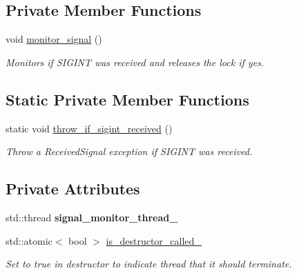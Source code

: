 \subsection*{Private Member Functions}
\begin{DoxyCompactItemize}
\item 
void \hyperlink{classtime__series_1_1internal_1_1TimeSeriesBase_adac95950208bcb190556db4b8b42cbf0}{monitor\+\_\+signal} ()
\begin{DoxyCompactList}\small\item\em Monitors if S\+I\+G\+I\+NT was received and releases the lock if yes. \end{DoxyCompactList}\end{DoxyCompactItemize}
\subsection*{Static Private Member Functions}
\begin{DoxyCompactItemize}
\item 
\mbox{\label{classtime__series_1_1internal_1_1TimeSeriesBase_a5033638ac101e5dde69400ff9dcd5fd3}} 
static void \hyperlink{classtime__series_1_1internal_1_1TimeSeriesBase_a5033638ac101e5dde69400ff9dcd5fd3}{throw\+\_\+if\+\_\+sigint\+\_\+received} ()
\begin{DoxyCompactList}\small\item\em Throw a Received\+Signal exception if S\+I\+G\+I\+NT was received. \end{DoxyCompactList}\end{DoxyCompactItemize}
\subsection*{Private Attributes}
\begin{DoxyCompactItemize}
\item 
\mbox{\label{classtime__series_1_1internal_1_1TimeSeriesBase_a54a885adf80cc0b240c2d1671e670199}} 
std\+::thread {\bfseries signal\+\_\+monitor\+\_\+thread\+\_\+}
\item 
\mbox{\label{classtime__series_1_1internal_1_1TimeSeriesBase_af341bff555b4e5881ae8426b0e5e9b30}} 
std\+::atomic$<$ bool $>$ \hyperlink{classtime__series_1_1internal_1_1TimeSeriesBase_af341bff555b4e5881ae8426b0e5e9b30}{is\+\_\+destructor\+\_\+called\+\_\+}
\begin{DoxyCompactList}\small\item\em Set to true in destructor to indicate thread that it should terminate. \end{DoxyCompactList}\end{DoxyCompactItemize}


